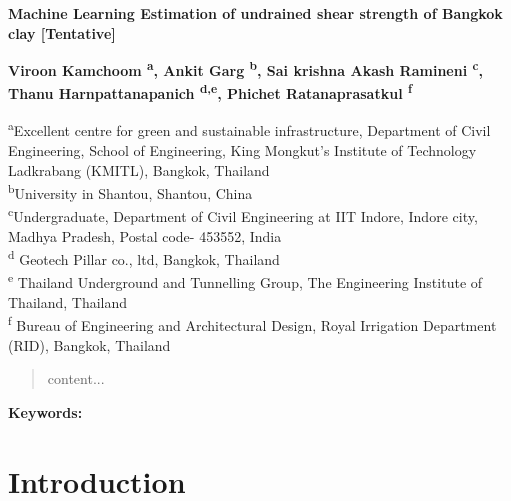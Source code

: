 \documentclass[12pt,a4paper]{article}
\begin{document}
	
	\begin{justify}
		\textbf{\Large
			Machine Learning Estimation of undrained shear strength of Bangkok clay [Tentative] 
		}
	\end{justify}
	
	\begin{flushleft}
		\textbf{Viroon Kamchoom \textsuperscript{a}, Ankit Garg \textsuperscript{b}, Sai krishna Akash Ramineni \textsuperscript{c}, Thanu Harnpattanapanich \textsuperscript{d,e}, Phichet Ratanaprasatkul \textsuperscript{f}}
	\end{flushleft}
	
	\begin{flushleft}
		{\small {\textsuperscript{a}Excellent centre for green and sustainable infrastructure, Department of Civil Engineering, School of Engineering, King Mongkut's Institute of Technology Ladkrabang (KMITL), Bangkok, Thailand \\ 
				\textsuperscript{b}University in Shantou, Shantou, China \\ 
				\textsuperscript{c}Undergraduate, Department of Civil Engineering at IIT Indore, Indore city, Madhya Pradesh, Postal code- 453552, India \\
				\textsuperscript{d} Geotech Pillar co., ltd, Bangkok, Thailand \\
				\textsuperscript{e} Thailand Underground and Tunnelling Group, The Engineering Institute of Thailand, Thailand \\
				\textsuperscript{f} Bureau of Engineering and Architectural Design, Royal Irrigation Department (RID), Bangkok, Thailand \\
		}}
	\end{flushleft}
	
	\begin{abstract}
		content...
	\end{abstract}
	
	\hspace{0.4cm} \textbf{Keywords:} 
	
	\section{Introduction}
	
\end{document}
